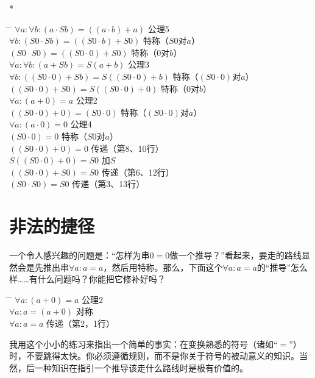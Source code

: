 \begin{center}
* \quad * \quad * \quad * \quad *
\end{center}

\begin{tabbing*}
\indent\indent \= \tabindent{-2em} \= \+\kill
$\forall a:\forall b:(a\cdot Sb)=((a\cdot b)+a)$ \>公理5\\
$\forall b:(S0\cdot Sb)=((S0\cdot b)+S0)$        \>特称（$S0$对$a$）\\
$(S0\cdot S0)=((S0\cdot 0)+S0)$                  \>特称（$0$对$b$）\\
$\forall a:\forall b:(a+Sb)=S(a+b)$              \>公理3\\
$\forall b:((S0\cdot 0)+Sb)=S((S0\cdot 0)+b)$    \>特称（$(S0\cdot 0)$对$a$）\\
$((S0\cdot 0)+S0)=S((S0\cdot 0)+0)$              \>特称（$0$对$b$）\\
$\forall a:(a+0)=a$                              \>公理2\\
$((S0\cdot 0)+0)=(S0\cdot 0)$                    \>特称（$(S0\cdot 0)$对$a$）\\
$\forall a:(a\cdot 0)=0$                         \>公理4\\
$(S0\cdot 0)=0$                                  \>特称（$S0$对$a$）\\
$((S0\cdot 0)+0)=0$                              \>传递（第8、10行）\\
$S((S0\cdot 0)+0)=S0$                            \>加$S$\\
$((S0\cdot 0)+S0)=S0$                            \>传递（第6、12行）\\
$(S0\cdot S0)=S0$                                \>传递（第3、13行）
\end{tabbing*}

\section{非法的捷径}

一个令人感兴趣的问题是：“怎样为串$0=0$做一个推导？”看起来，要走的路线显然会是先推出串$\forall a:a=a$，然后用特称。那么，下面这个$\forall a:a=a$的“推导”怎么样……有什么问题吗？你能把它修补好吗？

\begin{tabbing*}
\indent\indent \= \tabindent{-2em} \= \+\kill
$\forall a:(a+0)=a$ \>公理2\\
$\forall a:a=(a+0)$ \>对称\\
$\forall a:a=a$     \>传递（第2，1行）
\end{tabbing*}
我用这个小小的练习来指出一个简单的事实：在变换熟悉的符号（诸如“$=$”）时，不要跳得太快。你必须遵循规则，而不是你关于符号的被动意义的知识。当然，后一种知识在指引一个推导该走什么路线时是极有价值的。

